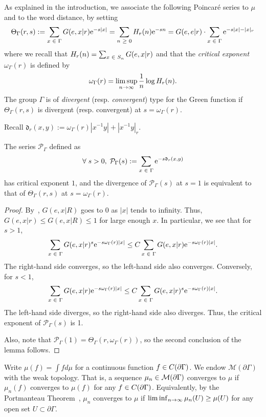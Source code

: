 \documentclass[AHL,Unicode,longabstracts]{cedram}
\newcommand{\pG}{\partial{\Gamma}}
\newcommand{\rme}{\mathrm{e}}
\newcommand{\fkd}{\mathfrak{d}}
\newcommand{\clM}{\mathcal{M}}
\newcommand{\clP}{\mathcal{P}}
\let\oldin\in
\renewcommand{\in}{\mathchoice{\oldin}{\oldin}{\,\oldin\,}{\,\oldin\,}}
\let\oldge\ge
\renewcommand{\ge}{\mathchoice{\oldge}{\oldge}{\,\oldge\,}{\,\oldge\,}}
\renewcommand*{\to}{\mathchoice{\longrightarrow}{\rightarrow}{\rightarrow}{\rightarrow}}
\let\oldforall\forall
\renewcommand*{\forall}{\mathrel{\oldforall}}
\begin{document}
As explained in the introduction, we associate the following Poincaré series to $\mu$ and to the word distance, by setting
\begin{align*}
\Theta_\Gamma({r, s}) := \sum_{x\in \Gamma} G(e, x |r) \rme^{-s|x|} = \sum_{n\ge 0} H_r(n) \rme^{-sn} =G(e,e|r)\cdot \sum_{x\in \Gamma} \rme^{-s|x|-|x|_r}
\end{align*}
where we recall that $H_r(n)=\sum_{x\in S_n} G(e,x|r)$ and that the
\emph{critical exponent} $\omega_\Gamma(r)$ is defined by
\[
\omega_\Gamma(r) = \limsup\limits_{n \to \infty} \frac{1}{n} \log H_r(n).
\]
The group $\Gamma$ is of \emph{divergent} (resp.
\emph{convergent}) type {for the Green function} if $\Theta_\Gamma({r,s})$ is divergent (resp. convergent) at $s=\omega_\Gamma(r)$.

Recall $\fkd_r(x,y):=\omega_\Gamma(r)|x^{-1}y| +|x^{-1}y|_r$.
\begin{lemm}\label{NewPoincareSeries}
The series $\clP_\Gamma$ defined as
\[
\forall s>0,\;\clP_{\Gamma}(s):=\sum\limits_{x \in \Gamma} \rme^{- s \fkd_r(x,y)}
\]
has critical exponent $1$, and the divergence of $\clP_{\Gamma}(s)$ at $s=1$ is equivalent to that of $\Theta_\Gamma({r,s})$ at $s=\omega_\Gamma(r)$.
\end{lemm}

\begin{proof}
By~\cite[Lemma~2.1]{GouezelLalley}, $G(e,x|R)$ goes to 0 as $|x|$ tends to infinity. Thus, $G(e,x|r)\leq G(e,x|R)\leq 1$ for large enough $x$. In particular, we see that for $s> 1$,
\[
\sum_{x\in \Gamma}G(e,x|r)^s\rme^{-s\omega_\Gamma(r) |x|}\leq C \sum_{x\in \Gamma}G(e,x|r)\rme^{-s\omega_\Gamma(r) |x|}.
\]
The right-hand side converges, so the left-hand side also converges. Conversely, for $s<1$,
\[
\sum_{x\in \Gamma}G(e,x|r)\rme^{-s\omega_\Gamma(r) |x|}\leq C \sum_{x\in \Gamma}G(e,x|r)^s\rme^{-s\omega_\Gamma(r) |x|}.
\]
The left-hand side diverges, so the right-hand side also diverges. Thus, the critical exponent of $\clP_\Gamma(s)$ is 1.

Also, note that $\clP_\Gamma(1)=\Theta_\Gamma(r,\omega_\Gamma(r))$, so the second conclusion of the lemma follows.
\end{proof}

Write $\mu(f) = \int f d\mu$ for a continuous function $f \in C(\pG)$. We endow $\clM(\pG)$ with the weak topology. That is, a sequence $\mu_n \in \clM(\pG)$ converges to $\mu$ if $\mu_n(f) $ converges to $ \mu(f)$ for any $f \in C(\pG)$. Equivalently, by the Portmanteau Theorem~\cite[Theorem~2.1]{Bill99}, $\mu_n$ converges to $\mu$ if $\liminf_{n \to \infty}\mu_n(U) \ge \mu(U)$ for any open set $U \subset \pG$.
\end{document}
